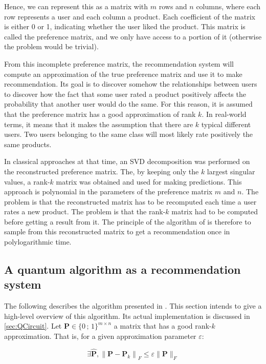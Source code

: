 \documentclass[11pt, a4paper]{article}
\begin{document}
            Hence, we can represent this as a matrix with \(m\) rows and \(n\) columns, where each row represents a user and each column a product. Each coefficient of the matrix is either 0 or 1, indicating whether the user liked the product. This matrix is called the preference matrix, and we only have access to a portion of it (otherwise the problem would be trivial).
            
            From this incomplete preference matrix, the recommendation system will compute an approximation of the true preference matrix and use it to make recommendation. Its goal is to discover somehow the relationships between users to discover how the fact that some user rated a product positively affects the probability that another user would do the same. For this reason, it is assumed that the preference matrix has a good approximation of rank \(k\). In real-world terms, it means that it makes the assumption that there are \(k\) typical different users. Two users belonging to the same class will most likely rate positively the same products.
            
            In classical approaches at that time, an SVD decomposition was performed on the reconstructed preference matrix. The, by keeping only the \(k\) largest singular values, a rank-\(k\) matrix was obtained and used for making predictions. This approach is polynomial in the parameters of the preference matrix \(m\) and \(n\). The problem is that the reconstructed matrix has to be recomputed each time a user rates a new product. The problem is that the rank-\(k\) matrix had to be computed before getting a result from it. The principle of the algorithm of \citeauthor{QRS} is therefore to sample from this reconstructed matrix to get a recommendation once in polylogarithmic time.
        \subsection{A quantum algorithm as a recommendation system}
            The following describes the algorithm presented in \cite{QRS}. This section intends to give a high-level overview of this algorithm. Its actual implementation is discussed in \autoref{sec:QCircuit}. Let \(\mathbf{P}\in\{0\,;\,1\}^{m\times n}\) a matrix that has a good rank-\(k\) approximation. That is, for a given approximation parameter \(\varepsilon\):
            
            \[\exists\hat{\mathbf{P}},\left\|\mathbf{P} - \mathbf{P}_k\right\|_F\leqslant\varepsilon\|\mathbf{P}\|_F\]
            
\end{document}
